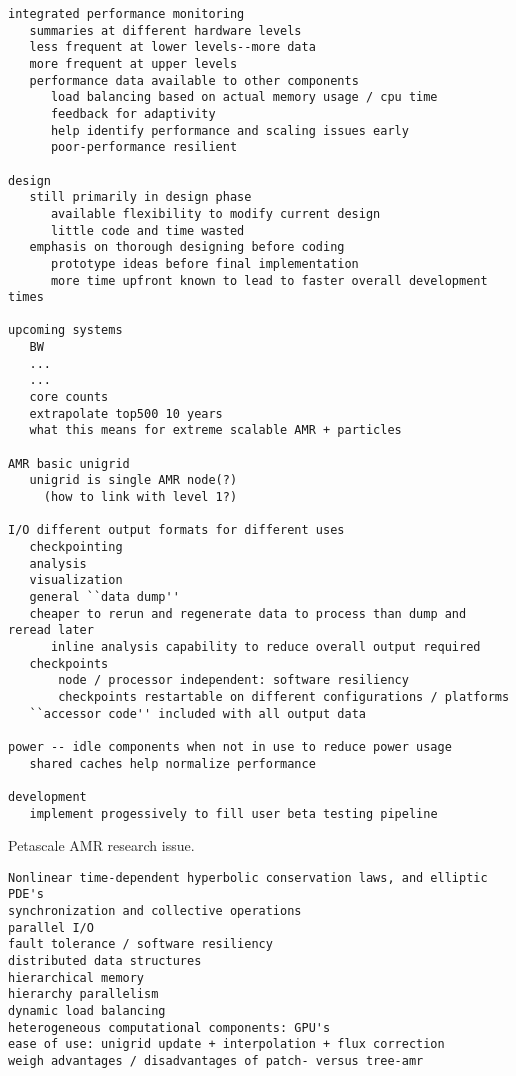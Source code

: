 \documentclass[14pt,letter]{article}
\begin{document}
\begin{verbatim}
integrated performance monitoring
   summaries at different hardware levels
   less frequent at lower levels--more data
   more frequent at upper levels
   performance data available to other components
      load balancing based on actual memory usage / cpu time
      feedback for adaptivity
      help identify performance and scaling issues early
      poor-performance resilient

design
   still primarily in design phase
      available flexibility to modify current design
      little code and time wasted
   emphasis on thorough designing before coding
      prototype ideas before final implementation
      more time upfront known to lead to faster overall development times

upcoming systems
   BW
   ...
   ...
   core counts
   extrapolate top500 10 years
   what this means for extreme scalable AMR + particles

AMR basic unigrid
   unigrid is single AMR node(?)
     (how to link with level 1?)

I/O different output formats for different uses
   checkpointing
   analysis
   visualization
   general ``data dump''
   cheaper to rerun and regenerate data to process than dump and reread later
      inline analysis capability to reduce overall output required
   checkpoints
       node / processor independent: software resiliency
       checkpoints restartable on different configurations / platforms
   ``accessor code'' included with all output data

power -- idle components when not in use to reduce power usage
   shared caches help normalize performance

development
   implement progessively to fill user beta testing pipeline
\end{verbatim}

Petascale AMR research issue.


\begin{verbatim}
Nonlinear time-dependent hyperbolic conservation laws, and elliptic PDE's
synchronization and collective operations
parallel I/O
fault tolerance / software resiliency
distributed data structures
hierarchical memory
hierarchy parallelism
dynamic load balancing
heterogeneous computational components: GPU's
ease of use: unigrid update + interpolation + flux correction
weigh advantages / disadvantages of patch- versus tree-amr
\end{verbatim}
\end{document}
